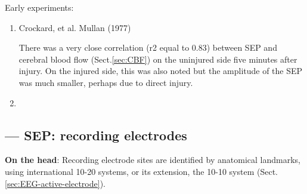 Early experiments:
\begin{enumerate}
  \item Crockard, et al. Mullan (1977)
  
There was a very close correlation (r2 equal to 0.83) between SEP and cerebral
blood flow (Sect.\ref{sec:CBF}) on the uninjured side five minutes after injury.
On the injured side, this was also noted but the amplitude of the SEP was much
smaller, perhaps due to direct injury.


  \item   
\end{enumerate}




\subsection{--- SEP: recording electrodes}
\label{sec:SEP-recording-electrodes}

{\bf On the head}:
Recording electrode sites are identified by anatomical landmarks, using
international 10-20 systems, or its extension, the 10-10 system
(Sect.\ref{sec:EEG-active-electrode}).


